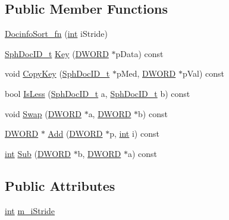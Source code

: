 \subsection*{Public Member Functions}
\begin{DoxyCompactItemize}
\item 
\hyperlink{structDocinfoSort__fn_adf84639a8ada5cf06a90d3885a47511e}{Docinfo\-Sort\-\_\-fn} (\hyperlink{sphinxexpr_8cpp_a4a26e8f9cb8b736e0c4cbf4d16de985e}{int} i\-Stride)
\item 
\hyperlink{sphinx_8h_a3176771631c12a9e4897272003e6b447}{Sph\-Doc\-I\-D\-\_\-t} \hyperlink{structDocinfoSort__fn_a16c8d53c9ec04b4f84ec19e8ac73701d}{Key} (\hyperlink{sphinxstd_8h_a798af1e30bc65f319c1a246cecf59e39}{D\-W\-O\-R\-D} $\ast$p\-Data) const 
\item 
void \hyperlink{structDocinfoSort__fn_a7b6b406e92ff8b61bb12d6dc5d716a93}{Copy\-Key} (\hyperlink{sphinx_8h_a3176771631c12a9e4897272003e6b447}{Sph\-Doc\-I\-D\-\_\-t} $\ast$p\-Med, \hyperlink{sphinxstd_8h_a798af1e30bc65f319c1a246cecf59e39}{D\-W\-O\-R\-D} $\ast$p\-Val) const 
\item 
bool \hyperlink{structDocinfoSort__fn_a6c1ba94d67f2add7c3b83eb47dc2b670}{Is\-Less} (\hyperlink{sphinx_8h_a3176771631c12a9e4897272003e6b447}{Sph\-Doc\-I\-D\-\_\-t} a, \hyperlink{sphinx_8h_a3176771631c12a9e4897272003e6b447}{Sph\-Doc\-I\-D\-\_\-t} b) const 
\item 
void \hyperlink{structDocinfoSort__fn_ac1002ae9787fda3b32da0cb413a5c7ed}{Swap} (\hyperlink{sphinxstd_8h_a798af1e30bc65f319c1a246cecf59e39}{D\-W\-O\-R\-D} $\ast$a, \hyperlink{sphinxstd_8h_a798af1e30bc65f319c1a246cecf59e39}{D\-W\-O\-R\-D} $\ast$b) const 
\item 
\hyperlink{sphinxstd_8h_a798af1e30bc65f319c1a246cecf59e39}{D\-W\-O\-R\-D} $\ast$ \hyperlink{structDocinfoSort__fn_a8b47b8bfcff14cf6dcf1e3dff928d372}{Add} (\hyperlink{sphinxstd_8h_a798af1e30bc65f319c1a246cecf59e39}{D\-W\-O\-R\-D} $\ast$p, \hyperlink{sphinxexpr_8cpp_a4a26e8f9cb8b736e0c4cbf4d16de985e}{int} i) const 
\item 
\hyperlink{sphinxexpr_8cpp_a4a26e8f9cb8b736e0c4cbf4d16de985e}{int} \hyperlink{structDocinfoSort__fn_ad81bd72f25bf173dd082b2d78ee04f49}{Sub} (\hyperlink{sphinxstd_8h_a798af1e30bc65f319c1a246cecf59e39}{D\-W\-O\-R\-D} $\ast$b, \hyperlink{sphinxstd_8h_a798af1e30bc65f319c1a246cecf59e39}{D\-W\-O\-R\-D} $\ast$a) const 
\end{DoxyCompactItemize}
\subsection*{Public Attributes}
\begin{DoxyCompactItemize}
\item 
\hyperlink{sphinxexpr_8cpp_a4a26e8f9cb8b736e0c4cbf4d16de985e}{int} \hyperlink{structDocinfoSort__fn_a8fb802504c8674670dd9c238797c349c}{m\-\_\-i\-Stride}
\end{DoxyCompactItemize}


